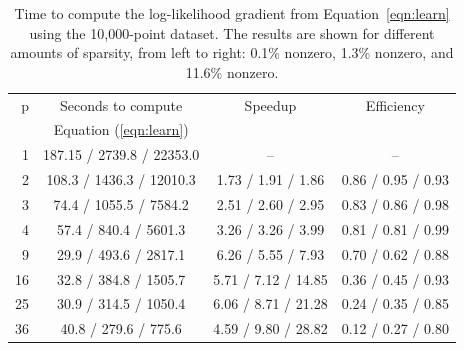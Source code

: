 \begin {table}
  \begin{center}
    \begin{tabular}{|r|c|c|c|}
      \hline
      p & Seconds to compute & Speedup & Efficiency \\
      & Equation (\ref{eqn:learn}) &  &  \\
      \hline
      1 & 187.15 / 2739.8 / 22353.0 & -- & -- \\
      2 & 108.3 / 1436.3 / 12010.3 & 1.73 / 1.91 / 1.86 & 0.86 / 0.95 / 0.93 \\
      3 & 74.4 / 1055.5 / 7584.2 & 2.51 / 2.60 / 2.95 & 0.83 / 0.86 / 0.98 \\
      4 & 57.4 / 840.4 / 5601.3 & 3.26 / 3.26 / 3.99 & 0.81 / 0.81 / 0.99 \\
      9 & 29.9 / 493.6 / 2817.1 & 6.26 / 5.55 / 7.93 & 0.70 / 0.62 / 0.88 \\
      16 & 32.8 / 384.8 / 1505.7 & 5.71 / 7.12 / 14.85 & 0.36 / 0.45 / 0.93 \\
      25 & 30.9 / 314.5 / 1050.4 & 6.06 / 8.71 / 21.28 & 0.24 / 0.35 / 0.85 \\
      36 & 40.8 / 279.6 / 775.6 & 4.59 / 9.80 / 28.82 & 0.12 / 0.27 / 0.80 \\
      \hline
    \end{tabular}
    \caption {{\small Time to compute the log-likelihood gradient from
        Equation~\ref{eqn:learn} using the 10,000-point dataset.  The results are shown
        for different amounts of sparsity, from left to right: 0.1\% nonzero, 1.3\%
        nonzero, and 11.6\% nonzero.  }}
    \label{tab:grad}
  \end{center}
\end {table}


